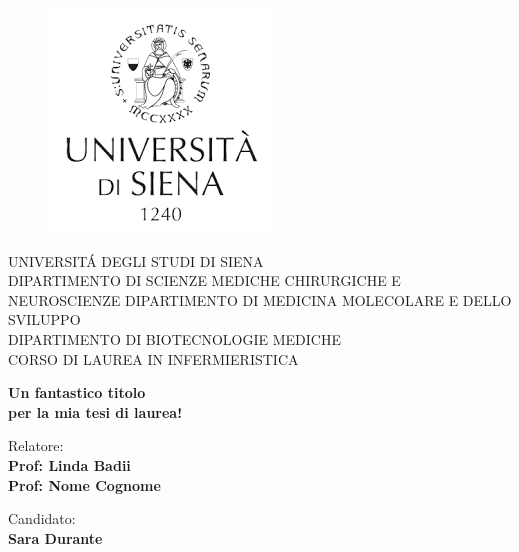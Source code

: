 \begin{titlepage}
\begin{figure}[!htb]
    \centering
    \includegraphics[keepaspectratio=true,scale=0.8]{format/img/unisi.png}
\end{figure}

\begin{center}
    \LARGE{UNIVERSIT\'A DEGLI STUDI DI SIENA}
    \vspace{5mm}
    \\ \large{DIPARTIMENTO DI SCIENZE MEDICHE CHIRURGICHE E NEUROSCIENZE
    DIPARTIMENTO DI MEDICINA MOLECOLARE E DELLO SVILUPPO\\
    DIPARTIMENTO DI BIOTECNOLOGIE MEDICHE}
    \vspace{5mm}
    \\ \LARGE{CORSO DI LAUREA IN INFERMIERISTICA}
\end{center}

\vspace{15mm}
\begin{center}
    {\LARGE{\bf Un fantastico titolo\\ \vspace{5mm} per la mia tesi di laurea! }}
    
    
\end{center}
\vspace{30mm}

\begin{minipage}[t]{0.47\textwidth}
	{\large{Relatore:}{\normalsize\vspace{3mm}
	\bf\\ \large{Prof: Linda Badii} \normalsize\vspace{3mm}\bf \\ \large{Prof: Nome Cognome}}}
\end{minipage}
\hfill
\begin{minipage}[t]{0.47\textwidth}\raggedleft
	{\large{Candidato:}{\normalsize\vspace{3mm} \bf\\ \large{Sara Durante}}}
\end{minipage}

\vspace{30mm}

\end{titlepage}